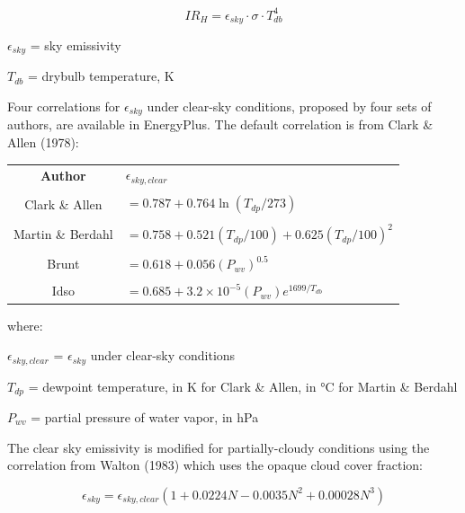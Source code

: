 \begin{equation}
IR_H = \epsilon_{sky} \cdot \sigma \cdot T_{db}^4
\end{equation}

$\epsilon_{sky}$ = sky emissivity

$T_{db}$ = drybulb temperature, \si{\kelvin}
\newline

Four correlations for $\epsilon_{sky}$ under clear-sky conditions, proposed by four sets of authors, are available in EnergyPlus. The default correlation is from Clark \& Allen (1978):

\begin{table}[hbtp]
\centering
\begin{tabular}{cl}
\textbf{Author}   & $\epsilon_{sky, clear}$ \\ \\
Clark \& Allen    & $= 0.787 + 0.764 \ln\left(T_{dp}/273\right)$ \\ \\
Martin \& Berdahl & $= 0.758 + 0.521 \left(T_{dp}/100\right) + 0.625  \left(T_{dp} / 100\right)^2$ \\ \\
Brunt             & $= 0.618 + 0.056 \left(P_{wv}\right)^{0.5}$ \\ \\
Idso              & $= 0.685 + 3.2\times10^{-5} \left(P_{wv}\right) e^{1699/T_{db}} $
\end{tabular}
\end{table}

\noindent where:
\newline

$\epsilon_{sky, clear}$ = $\epsilon_{sky}$ under clear-sky conditions
\newline

$T_{dp}$ = dewpoint temperature, in \si{\kelvin} for Clark \& Allen, in \si{\celsius} for Martin \& Berdahl
\newline

$P_{wv}$ = partial pressure of water vapor, in \si{\hecto\pascal}
\newline

The clear sky emissivity is modified for partially-cloudy conditions using the correlation from Walton (1983) which uses the opaque cloud cover fraction:

\begin{equation}
\epsilon_{sky} = \epsilon_{sky, clear} \left(1 + 0.0224  N - 0.0035  N^2 + 0.00028  N^3\right)
\end{equation}


